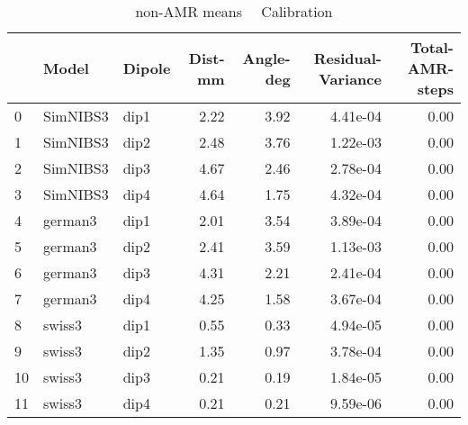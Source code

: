 \documentclass{article}
\begin{document}
\begin{table}
\begin{tabular}{lllrrrr}
\toprule
& Model& Dipole& Dist-mm& Angle-deg& Residual-Variance& Total-AMR-steps\\
\midrule
\rowcolor{lightgray}0 & SimNIBS3 & dip1 & 2.22 & 3.92 & 4.41e-04 & 0.00\\
\rowcolor{lightgray}1 & SimNIBS3 & dip2 & 2.48 & 3.76 & 1.22e-03 & 0.00\\
\rowcolor{lightgray}2 & SimNIBS3 & dip3 & 4.67 & 2.46 & 2.78e-04 & 0.00\\
\rowcolor{lightgray}3 & SimNIBS3 & dip4 & 4.64 & 1.75 & 4.32e-04 & 0.00\\
\rowcolor{yellow}4 & german3 & dip1 & 2.01 & 3.54 & 3.89e-04 & 0.00\\
\rowcolor{yellow}5 & german3 & dip2 & 2.41 & 3.59 & 1.13e-03 & 0.00\\
\rowcolor{yellow}6 & german3 & dip3 & 4.31 & 2.21 & 2.41e-04 & 0.00\\
\rowcolor{yellow}7 & german3 & dip4 & 4.25 & 1.58 & 3.67e-04 & 0.00\\
\rowcolor{pink}8 & swiss3 & dip1 & 0.55 & 0.33 & 4.94e-05 & 0.00\\
\rowcolor{pink}9 & swiss3 & dip2 & 1.35 & 0.97 & 3.78e-04 & 0.00\\
\rowcolor{pink}10 & swiss3 & dip3 & 0.21 & 0.19 & 1.84e-05 & 0.00\\
\rowcolor{pink}11 & swiss3 & dip4 & 0.21 & 0.21 & 9.59e-06 & 0.00\\
\end{tabular}
\caption{non-AMR means \ \textemdash \ Calibration}
\end{table}
\end{document}
